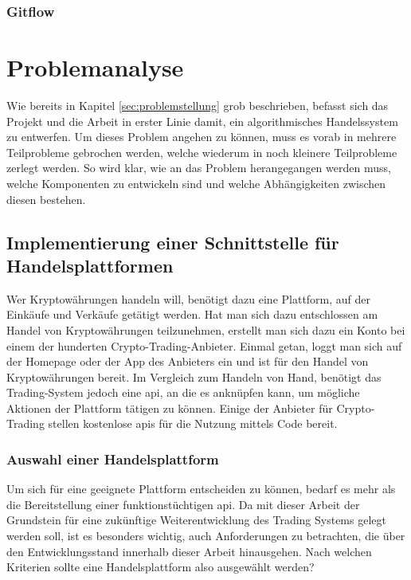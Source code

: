 \documentclass[oneside]{ausarbeitung}
\begin{document}
\subsection{Gitflow}
\label{sub:gitflow}

\chapter{Problemanalyse}
\label{cha:problemanalyse}

Wie bereits in Kapitel \ref{sec:problemstellung} grob beschrieben, befasst sich das Projekt und die Arbeit in erster Linie damit, ein algorithmisches Handelssystem zu entwerfen. Um dieses Problem angehen zu können, muss es vorab in mehrere Teilprobleme gebrochen werden, welche wiederum in noch kleinere Teilprobleme zerlegt werden. So wird klar, wie an das Problem herangegangen werden muss, welche Komponenten zu entwickeln sind und welche Abhängigkeiten zwischen diesen bestehen.

\section{Implementierung einer Schnittstelle für Handelsplattformen}
\label{sec:schnittstelle_handelsplatform}

Wer Kryptowährungen handeln will, benötigt dazu eine Plattform, auf der Einkäufe und Verkäufe getätigt werden. Hat man sich dazu entschlossen am Handel von Kryptowährungen teilzunehmen, erstellt man sich dazu ein Konto bei einem der hunderten Crypto-Trading-Anbieter. Einmal getan, loggt man sich auf der Homepage oder der App des Anbieters ein und ist für den Handel von Kryptowährungen bereit. Im Vergleich zum Handeln von Hand, benötigt das Trading-System jedoch eine \ac{api}, an die es anknüpfen kann, um mögliche Aktionen der Plattform tätigen zu können. Einige der Anbieter für Crypto-Trading stellen kostenlose \ac{api}s für die Nutzung mittels Code bereit.

\subsection{Auswahl einer Handelsplattform}
\label{sub:auswahl_plattform}

Um sich für eine geeignete Plattform entscheiden zu können, bedarf es mehr als die Bereitstellung einer funktionstüchtigen \ac{api}. Da mit dieser Arbeit der Grundstein für eine zukünftige Weiterentwicklung des Trading Systems gelegt werden soll, ist es besonders wichtig, auch Anforderungen zu betrachten, die über den Entwicklungsstand innerhalb dieser Arbeit hinausgehen. Nach welchen Kriterien sollte eine Handelsplattform also ausgewählt werden? \\
\end{document}
